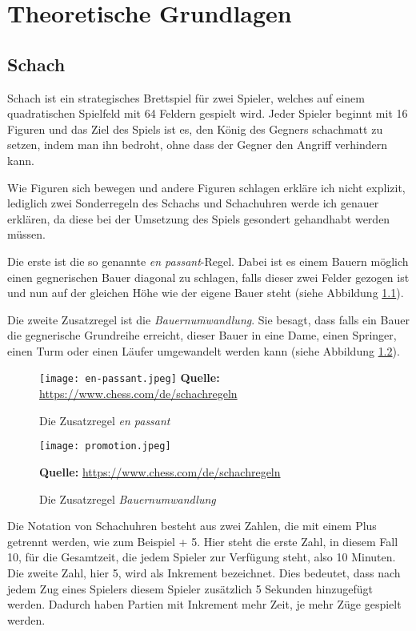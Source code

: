\chapter{Theoretische Grundlagen}
    \section{Schach}
    \label{sec:schach-theorie}
   Schach ist ein strategisches Brettspiel für zwei Spieler, welches auf einem quadratischen Spielfeld mit 64 Feldern gespielt wird. Jeder Spieler beginnt mit 16 Figuren und das Ziel des Spiels ist es, den König des Gegners schachmatt zu setzen, indem man ihn bedroht, ohne dass der Gegner den Angriff verhindern kann. 
   
   Wie Figuren sich bewegen und andere Figuren schlagen erkläre ich nicht explizit, lediglich zwei Sonderregeln des Schachs und Schachuhren werde ich genauer erklären, da diese bei der Umsetzung des Spiels gesondert gehandhabt werden müssen.
   
   Die erste ist die so genannte \textit{en passant}-Regel. Dabei ist es einem Bauern möglich einen gegnerischen Bauer diagonal zu schlagen, falls dieser zwei Felder gezogen ist und nun auf der gleichen Höhe wie der eigene Bauer steht (siehe Abbildung \ref{fig:en-passant}).
   
   Die zweite Zusatzregel ist die \textit{Bauernumwandlung}. Sie besagt, dass falls ein Bauer die gegnerische Grundreihe erreicht, dieser Bauer in eine Dame, einen Springer, einen Turm oder einen Läufer umgewandelt werden kann (siehe Abbildung \ref{fig:promotion}).
   
     \begin{figure}[ht]
\raggedleft
  \texttt{[image: en-passant.jpeg]}
    \footnotesize\sffamily\textbf{Quelle:} \url{https://www.chess.com/de/schachregeln}
  \caption{Die Zusatzregel \textit{en passant}}
  \label{fig:en-passant}
\end{figure}

  \begin{figure}[ht]
\centering
  \texttt{[image: promotion.jpeg]}
   
   
\raggedleft
    \footnotesize\sffamily\textbf{Quelle:} \url{https://www.chess.com/de/schachregeln}
  \caption{Die Zusatzregel \textit{Bauernumwandlung}}
  \label{fig:promotion}
\end{figure}

Die Notation von Schachuhren besteht aus zwei Zahlen, die mit einem Plus getrennt werden, wie zum Beispiel  + 5\grqq .  Hier steht die erste Zahl, in diesem Fall 10, für die Gesamtzeit, die jedem Spieler zur Verfügung steht, also 10 Minuten. Die zweite Zahl, hier 5, wird als Inkrement bezeichnet. Dies bedeutet, dass nach jedem Zug eines Spielers diesem Spieler zusätzlich 5 Sekunden hinzugefügt werden. Dadurch haben Partien mit Inkrement mehr Zeit, je mehr Züge gespielt werden.

